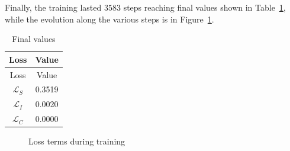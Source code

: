 \documentclass[
]{article}
\begin{document}
Finally, the training lasted \(3583\) steps reaching final values shown
in Table~\ref{tbl-training}, while the evolution along the various steps
is in Figure~\ref{fig-training}.

\begin{longtable}[]{@{}cc@{}}
\caption{Final values}\label{tbl-training}\tabularnewline
\toprule\noalign{}
Loss & Value \\
\midrule\noalign{}
\endfirsthead
\toprule\noalign{}
Loss & Value \\
\midrule\noalign{}
\endhead
\bottomrule\noalign{}
\endlastfoot
\(\mathcal{L}_S\) & 0.3519 \\
\(\mathcal{L}_I\) & 0.0020 \\
\(\mathcal{L}_C\) & 0.0000 \\
\end{longtable}

\begin{figure}


\caption{\label{fig-training}Loss terms during training}

\end{figure}%
\end{document}
